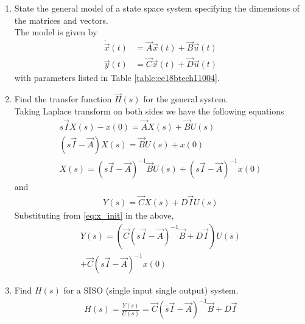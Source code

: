 \begin{enumerate}[label=\thesection.\arabic*.,ref=\thesection.\theenumi]
\item State the general model of a state space system specifying the dimensions of the matrices and vectors.
\\
\solution The model is given by 
\begin{align}
\dot{\vec{x}}(t)&=\vec{A}\vec{x}(t)+\vec{B}\vec{u}(t) \\
 \vec{y}(t)&=\vec{C}\vec{x}(t)+\vec{D} \vec{u}(t)
\end{align}
%
with parameters listed in Table \ref{table:ee18btech11004}.
%
\begin{table}[!ht]
\centering

\caption{}
\label{table:ee18btech11004}
\end{table}
\item Find the transfer function $\vec{H}(s)$ for the general system.
\\
\solution 
Taking Laplace transform on both sides we have the following equations
\begin{align}
s\vec{I}X(s)-x(0)= \vec{A}X(s)+ \vec{B}U(s)\\
(s\vec{I}-\vec{A})X(s)= \vec{B}U(s)+ x(0)\\
X(s)={(s\vec{I}-\vec{A})^{-1}}\vec{B} U(s)+ (s\vec{I}-\vec{A})^{-1}x(0)
\label{eq:x_init}
\end{align}
and
\begin{align}
Y(s)= \vec{C}X(s)+D\vec{I}U(s)
\end{align}
Substituting from \eqref{eq:x_init} in the above,
%
\begin{multline}
Y(s)=( \vec{C}{(s\vec{I}-\vec{A})^{-1}}\vec{B}+D\vec{I}) U(s) 
\\
+ \vec{C}(s\vec{I}-\vec{A})^{-1}x(0)
\end{multline}
%
\item Find $H(s)$ for a SISO (single input single output) system.
\\
\solution
\begin{align}
H(s)= {\frac{Y(s)}{U(s)}}=  \vec{C}{(s\vec{I}-\vec{A})^{-1}}\vec{B}+D\vec{I}
\end{align}


\end{enumerate}
